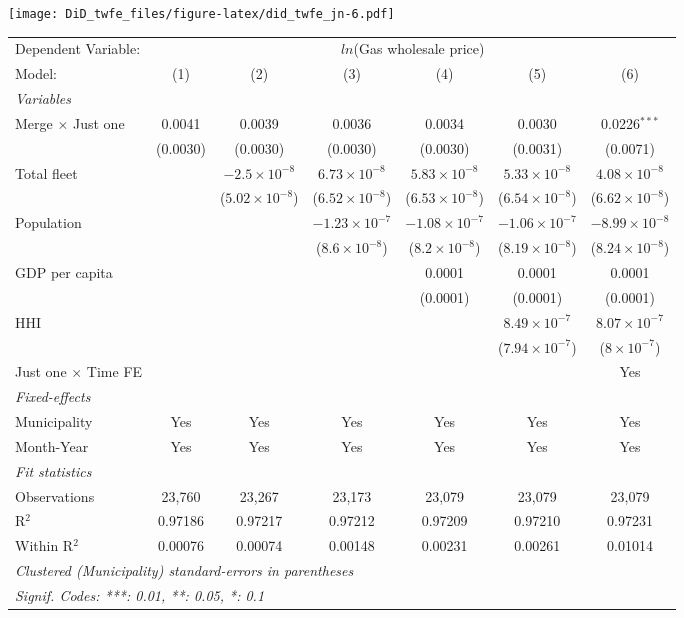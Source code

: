 \documentclass[
]{article}
\begin{document}
\texttt{[image: DiD\_twfe\_files/figure-latex/did\_twfe\_jn-6.pdf]}

\begin{tabular}{lcccccc}
\tabularnewline\midrule\midrule
Dependent Variable:&\multicolumn{6}{c}{$ln$(Gas wholesale price)}\\
Model:&(1) & (2) & (3) & (4) & (5) & (6)\\
\midrule \emph{Variables}&   &   &   &   &   &  \\
Merge $\times $ Just one & 0.0041 & 0.0039 & 0.0036 & 0.0034 & 0.0030 & 0.0226$^{***}$\\
  &(0.0030) & (0.0030) & (0.0030) & (0.0030) & (0.0031) & (0.0071)\\
Total fleet &    & $-2.5\times 10^{-8}$ & $6.73\times 10^{-8}$ & $5.83\times 10^{-8}$ & $5.33\times 10^{-8}$ & $4.08\times 10^{-8}$\\
  &   & ($5.02\times 10^{-8}$) & ($6.52\times 10^{-8}$) & ($6.53\times 10^{-8}$) & ($6.54\times 10^{-8}$) & ($6.62\times 10^{-8}$)\\
Population &    &    & $-1.23\times 10^{-7}$ & $-1.08\times 10^{-7}$ & $-1.06\times 10^{-7}$ & $-8.99\times 10^{-8}$\\
  &   &    & ($8.6\times 10^{-8}$) & ($8.2\times 10^{-8}$) & ($8.19\times 10^{-8}$) & ($8.24\times 10^{-8}$)\\
GDP per capita &    &    &    & 0.0001 & 0.0001 & 0.0001\\
  &   &    &    & (0.0001) & (0.0001) & (0.0001)\\
HHI &    &    &    &    & $8.49\times 10^{-7}$ & $8.07\times 10^{-7}$\\
  &   &    &    &    & ($7.94\times 10^{-7}$) & ($8\times 10^{-7}$)\\
Just one $\times$ Time FE &  &  &  &  &  & Yes\\
\midrule \emph{Fixed-effects}&   &   &   &   &   &  \\
Municipality & Yes & Yes & Yes & Yes & Yes & Yes\\
Month-Year & Yes & Yes & Yes & Yes & Yes & Yes\\
\midrule \emph{Fit statistics}&  & & & & & \\
Observations & 23,760&23,267&23,173&23,079&23,079&23,079\\
R$^2$ & 0.97186&0.97217&0.97212&0.97209&0.97210&0.97231\\
Within R$^2$ & 0.00076&0.00074&0.00148&0.00231&0.00261&0.01014\\
\midrule\midrule\multicolumn{7}{l}{\emph{Clustered (Municipality) standard-errors in parentheses}}\\
\multicolumn{7}{l}{\emph{Signif. Codes: ***: 0.01, **: 0.05, *: 0.1}}\\
\end{tabular}
\end{document}
